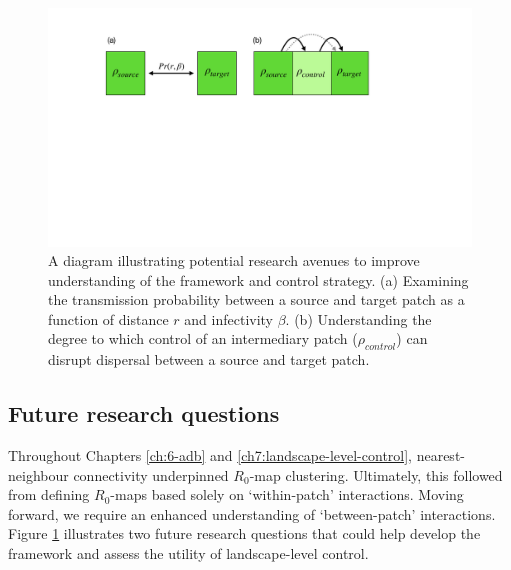 


\begin{figure}
    \centering
    \includegraphics[scale=0.35]{chapter7/figures/figure5-future-reserach.pdf}
    \caption{A diagram illustrating potential research avenues to improve understanding of the framework and control strategy. 
    (a) Examining the transmission probability between a source and target patch as a function of distance $r$ and infectivity $\beta$. 
    (b) Understanding the degree to which control of an intermediary patch ($\rho_{control}$) can disrupt dispersal between a source and target patch.}
    \label{fig:future-research}
\end{figure}

\subsection{Future research questions}
\label{sec:future-questions}
Throughout Chapters \ref{ch:6-adb} and \ref{ch7:landscape-level-control}, nearest-neighbour connectivity underpinned $R_0$-map clustering.
Ultimately, this followed from defining $R_0$-maps based solely on `within-patch' interactions. Moving forward, we require an enhanced understanding of `between-patch' interactions.
Figure \ref{fig:future-research} illustrates two future research questions that could help develop the framework and assess the utility of landscape-level control.

